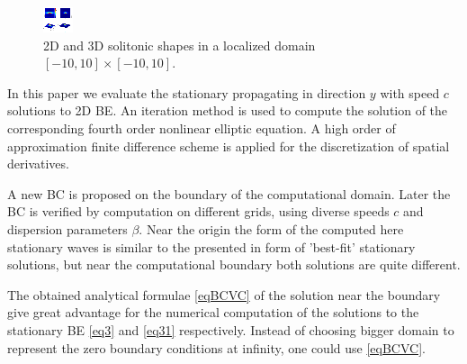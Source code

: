 \documentclass[12pt]{article}
\theoremstyle{theorem}
\theoremstyle{defi}
\begin{document}
\begin{figure}[htbp]
        \centering
              \includegraphics[width=0.98\linewidth]{figure2.eps}
        \caption{ 2D and 3D solitonic shapes in a localized domain  $[-10, 10] \times [-10, 10]$.}
	\label{fig2}
\end{figure}

	In this paper we evaluate the stationary propagating in direction $y$ with speed $c$ solutions to 2D BE. An iteration method is used to compute the solution of the corresponding fourth order nonlinear  elliptic equation. A high order of approximation finite difference scheme is applied for the discretization of spatial derivatives.

A new BC is proposed on the boundary of the computational domain. Later the BC is verified by computation on different grids, using diverse speeds $c$ and dispersion parameters $\beta$. Near the origin the form of the computed here stationary waves is similar to the presented in \cite{ref10} form of 'best-fit' stationary solutions, but near the computational boundary both solutions are quite different.

The obtained analytical formulae \eqref{eqBCVC} of the solution near the boundary give great advantage for the numerical computation of the solutions to the stationary BE \eqref{eq3} and \eqref{eq31} respectively. Instead of choosing bigger domain to represent the zero boundary conditions at infinity, one could use \eqref{eqBCVC}.
\end{document}
